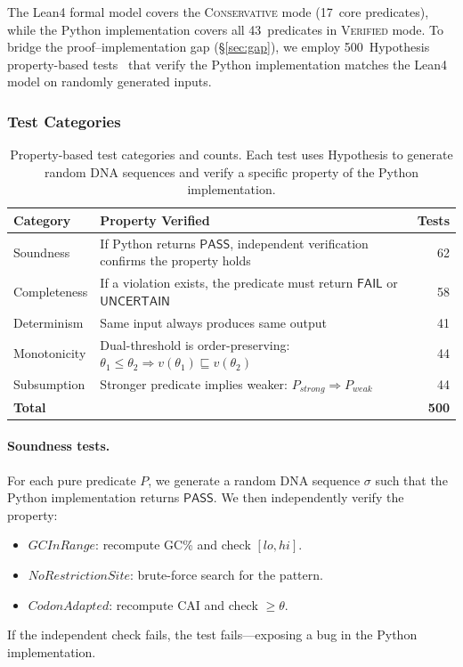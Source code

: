 \documentclass[acmsmall,review,anonymous]{acmart}
\newcommand{\PASS}{\ensuremath{\mathsf{PASS}}\xspace}
\newcommand{\FAIL}{\ensuremath{\mathsf{FAIL}}\xspace}
\newcommand{\UNCERTAIN}{\ensuremath{\mathsf{UNCERTAIN}}\xspace}
\newcommand{\seq}{\sigma}
\newcommand{\pred}{P}
\newcommand{\verdict}{v}
\newcommand{\CONSERVATIVE}{\textsc{Conservative}\xspace}
\newcommand{\VERIFIED}{\textsc{Verified}\xspace}
\begin{document}
The Lean4 formal model covers the \CONSERVATIVE{} mode (17~core
predicates), while the Python implementation covers all 43~predicates
in \VERIFIED{} mode.
To bridge the proof--implementation gap (\S\ref{sec:gap}), we employ
500~Hypothesis property-based tests~\cite{maciver2019hypothesis}
that verify the Python implementation matches the Lean4 model on
randomly generated inputs.

\subsubsection{Test Categories}

\begin{table}[t]
\centering
\caption{Property-based test categories and counts. Each test uses
         Hypothesis to generate random DNA sequences and verify a
         specific property of the Python implementation.}
\label{tab:pbt}
\begin{tabular}{lp{6.5cm}r}
\toprule
\textbf{Category} & \textbf{Property Verified} & \textbf{Tests} \\
\midrule
Soundness &
  If Python returns \PASS{}, independent verification confirms
  the property holds & 62 \\
Completeness &
  If a violation exists, the predicate must return \FAIL{} or
  \UNCERTAIN{} & 58 \\
Determinism &
  Same input always produces same output & 41 \\
Monotonicity &
  Dual-threshold is order-preserving:
  $\theta_1 \le \theta_2 \Rightarrow
   \verdict(\theta_1) \sqsubseteq \verdict(\theta_2)$ & 44 \\
Subsumption &
  Stronger predicate implies weaker:
  $\pred_{\mathit{strong}} \Rightarrow \pred_{\mathit{weak}}$
  & 44 \\
\midrule
\textbf{Total} & & \textbf{500} \\
\bottomrule
\end{tabular}
\end{table}

\paragraph{Soundness tests.}
For each pure predicate $\pred$, we generate a random DNA sequence
$\seq$ such that the Python implementation returns \PASS.
We then independently verify the property:
\begin{itemize}[leftmargin=*,itemsep=0pt,topsep=1pt]
\item $\mathit{GCInRange}$: recompute GC\% and check $[lo, hi]$.
\item $\mathit{NoRestrictionSite}$: brute-force search for the
      pattern.
\item $\mathit{CodonAdapted}$: recompute CAI and check $\ge \theta$.
\end{itemize}
If the independent check fails, the test fails---exposing a bug in the
Python implementation.
\end{document}
